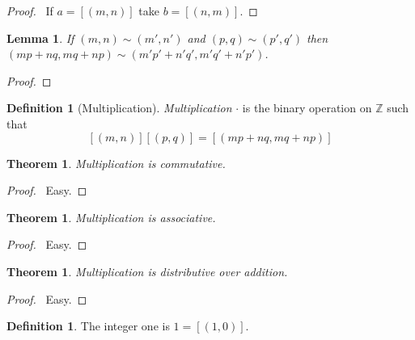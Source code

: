 \documentclass{article}
\let\qed\relax
\newtheorem{lemma}[axiom]{Lemma}
\newtheorem{theorem}[axiom]{Theorem}
\theoremstyle{definition}
\newtheorem{definition}[axiom]{Definition}
\begin{document}
    \begin{proof}
        \pf\ If $a = [(m,n)]$ take $b = [(n,m)]$. \qed
    \end{proof}

    \begin{lemma}
        If $(m,n) \sim (m',n')$ and $(p,q) \sim (p',q')$ then $(mp+nq,mq+np) \sim (m'p'+n'q',
        m'q'+n' p')$.
    \end{lemma}

    \begin{proof}
        \pf
        \qed
    \end{proof}

    \begin{definition}[Multiplication]
        \emph{Multiplication} $\cdot$ is the binary operation on $\mathbb{Z}$ such that
        \[ [(m,n)][(p,q)] = [(mp+nq,mq+np)] \]
    \end{definition}

    \begin{theorem}
        Multiplication is commutative.
    \end{theorem}

    \begin{proof}
        \pf\ Easy. \qed
    \end{proof}

    \begin{theorem}
        Multiplication is associative.
    \end{theorem}

    \begin{proof}
        \pf\ Easy. \qed
    \end{proof}

    \begin{theorem}
        Multiplication is distributive over addition.
    \end{theorem}

    \begin{proof}
        \pf\ Easy. \qed
    \end{proof}

    \begin{definition}
        The integer one is $1 = [(1,0)]$.
    \end{definition}
\end{document}
